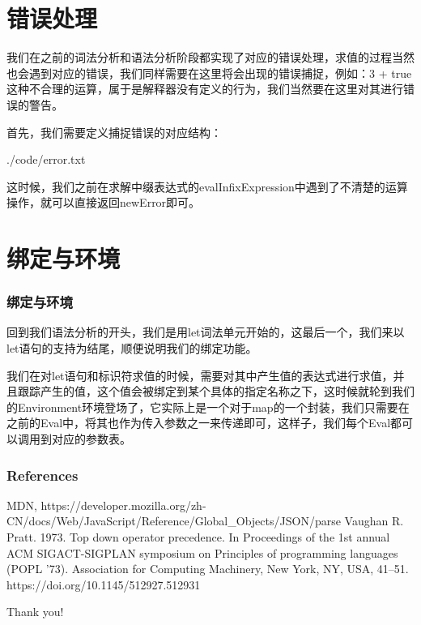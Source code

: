 \documentclass{beamer}
\begin{document}
	\section{错误处理}
	\begin{frame}
		我们在之前的词法分析和语法分析阶段都实现了对应的错误处理，求值的过程当然也会遇到对应的错误，我们同样需要在这里将会出现的错误捕捉，例如：3 + true这种不合理的运算，属于是解释器没有定义的行为，我们当然要在这里对其进行错误的警告。
		
		首先，我们需要定义捕捉错误的对应结构：
		
		
		{./code/error.txt}
		
		
		这时候，我们之前在求解中缀表达式的evalInfixExpression中遇到了不清楚的运算操作，就可以直接返回newError即可。
	\end{frame}
	\section{绑定与环境}
	\begin{frame}
		\frametitle{绑定与环境}
		回到我们语法分析的开头，我们是用let词法单元开始的，这最后一个，我们来以let语句的支持为结尾，顺便说明我们的绑定功能。
		
		我们在对let语句和标识符求值的时候，需要对其中产生值的表达式进行求值，并且跟踪产生的值，这个值会被绑定到某个具体的指定名称之下，这时候就轮到我们的Environment环境登场了，它实际上是一个对于map的一个封装，我们只需要在之前的Eval中，将其也作为传入参数之一来传递即可，这样子，我们每个Eval都可以调用到对应的参数表。
	\end{frame}
     \begin{frame}
		\frametitle{References}
		
		\begin{thebibliography}{99}
			\bibitem{[1]} MDN, https://developer.mozilla.org/zh-CN/docs/Web/JavaScript/Reference/Global\_Objects/JSON/parse
			\bibitem{[2]} Vaughan R. Pratt. 1973. Top down operator precedence. In Proceedings of the 1st annual ACM SIGACT-SIGPLAN symposium on Principles of programming languages (POPL '73). Association for Computing Machinery, New York, NY, USA, 41–51. https://doi.org/10.1145/512927.512931
		\end{thebibliography}
	\end{frame}
	\begin{frame}
		\Huge{\centerline{Thank you!}}
	\end{frame}
\end{document}
